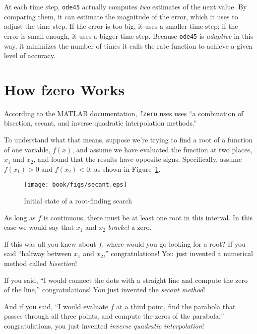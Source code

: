 At each time step, \lstinline{ode45} actually computes {\em two} estimates of the next value.
By comparing them, it can estimate the magnitude of the error, which it uses to adjust the time step.
If the error is too big, it uses a smaller time step; if the error is small enough, it uses a bigger time step.
Because \lstinline{ode45} is \emph{adaptive} in this way, it minimizes the number of times it calls the rate function to achieve a given level of accuracy.



\section{How fzero Works}
\label{howfzero}

According to the MATLAB documentation, \lstinline{fzero} uses uses ``a combination of bisection, secant, and inverse quadratic interpolation methods.''


To understand what that means, suppose we're trying to find a root of a function of one variable, $f(x)$, and assume we have evaluated the function at two places, $x_1$ and $x_2$, and found that the results have opposite signs.  Specifically, assume $f(x_1) > 0$ and $f(x_2) < 0$, as shown in Figure~\ref{fig:secant}.

\begin{figure}[ht]
\centerline{\texttt{[image: book/figs/secant.eps]}}
\caption{Initial state of a root-finding search}
\label{fig:secant}
\end{figure}

As long as $f$ is continuous, there must be at least one root in this interval.
In this case we would say that $x_1$ and $x_2$ \emph{bracket} a zero.


If this was all you knew about $f$, where would you go looking for
a root?  If you said ``halfway between $x_1$ and $x_2$,''
congratulations!  You just invented a numerical method called
\emph{bisection}!

If you said, ``I would connect the dots with a straight line
and compute the zero of the line,''
congratulations!  You just invented the \emph{secant method}!

And if you said, ``I would evaluate $f$ at a third point, find the
parabola that passes through all three points, and compute the zeros
of the parabola,'' congratulations, you just invented
\emph{inverse quadratic interpolation}!

